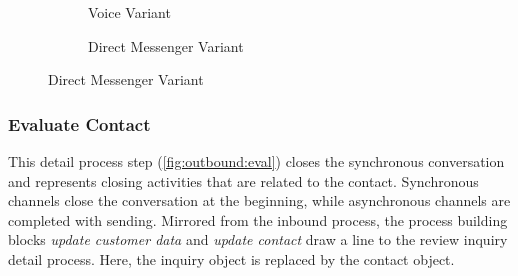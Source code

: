 \begin{figure}[caption={Contact Customer Detail Process}, label={fig:outbound:con}]
\begin{subfigure}[b]{.45\textwidth}
\begin{tikzpicture}
	 		\end{tikzpicture}
	 		\caption{Voice Variant}\label{fig:outbound:con:voice}
	 	\end{subfigure}
	 	\begin{subfigure}[b]{.45\textwidth}
	 		\centering	
	 		\caption{Direct Messenger Variant}\label{fig:outbound:con:dm}
	 	\end{subfigure}
	 \end{figure}
	 
	 
	 
	 \subsubsection{Evaluate Contact}
	 
	 This detail process step (\Fig \ref{fig:outbound:eval}) closes the synchronous conversation and represents closing activities that are related to the contact. Synchronous channels close the conversation at the beginning, while asynchronous channels are completed with sending. Mirrored from the inbound process, the process building blocks \textit{update customer data} and \textit{update contact} draw a line to the review inquiry detail process. Here, the inquiry object is replaced by the contact object. 
	 
